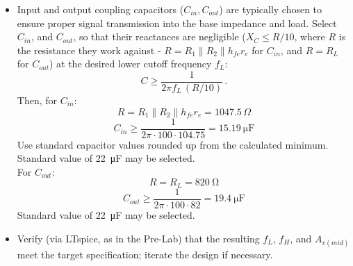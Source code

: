 \begin{enumerate}
\begin{itemize}
		\item Input and output coupling capacitors ($C_{in}, C_{out}$) are typically chosen to ensure proper signal transmission into the base impedance and load.  Select $C_{in}$, and $C_{out}$, so that their reactances are negligible ($X_C\leq R/10$, where $R$ is the resistance they work against - $R=R_1\rVert R_2\rVert h_{fe}r_e$ for $C_{in}$, and $R=R_L$ for $C_{out}$) at the desired lower cutoff frequency $f_L$:
		\begin{equation}
			C \geq \frac{1}{2\pi f_L\,(R/10)}\,.
			\label{eq:cap_design}
		\end{equation}
		Then, for $C_{in}$:
		\[
		R = R_1\rVert R_2\rVert h_{fe}r_e = 1047.5\, \Omega
		\]
		\[
		C_{in} \geq \dfrac{1}{2\pi\cdot100\cdot104.75} = \SI{15.19}{\micro\farad}
		\]
		Use standard capacitor values rounded up from the calculated minimum. Standard value of \SI{22}{\micro\farad} may be selected.\\
		For $C_{out}$:
		\[
		R = R_L =\SI{820}{\ohm}
		\]
		\[
		C_{out} \geq \dfrac{1}{2\pi\cdot100\cdot82} = \SI{19.4}{\micro\farad}
		\]
		Standard value of \SI{22}{\micro\farad} may be selected.
		\item Verify (via LTspice, as in the Pre-Lab) that the resulting $f_L$, $f_H$, and $A_{v(mid)}$ meet the target specification; iterate the design if necessary.
	\end{itemize}
	
\end{enumerate}
%


